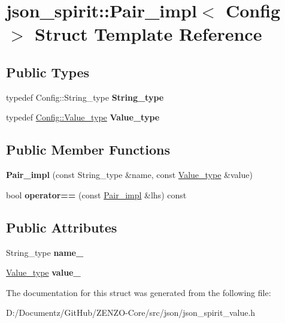 \hypertarget{structjson__spirit_1_1_pair__impl}{}\section{json\+\_\+spirit\+::Pair\+\_\+impl$<$ Config $>$ Struct Template Reference}
\label{structjson__spirit_1_1_pair__impl}
\subsection*{Public Types}
\begin{DoxyCompactItemize}
\item 
\mbox{\label{structjson__spirit_1_1_pair__impl_a76ee499775d02d1038a2b8c71621f2c8}} 
typedef Config\+::\+String\+\_\+type {\bfseries String\+\_\+type}
\item 
\mbox{\label{structjson__spirit_1_1_pair__impl_aa679fec3c6ec4c76f94460d3815cf1fb}} 
typedef \mbox{\hyperlink{classjson__spirit_1_1_value__impl}{Config\+::\+Value\+\_\+type}} {\bfseries Value\+\_\+type}
\end{DoxyCompactItemize}
\subsection*{Public Member Functions}
\begin{DoxyCompactItemize}
\item 
\mbox{\label{structjson__spirit_1_1_pair__impl_a17be0aede10233fadd376a3fb77fd962}} 
{\bfseries Pair\+\_\+impl} (const String\+\_\+type \&name, const \mbox{\hyperlink{classjson__spirit_1_1_value__impl}{Value\+\_\+type}} \&value)
\item 
\mbox{\label{structjson__spirit_1_1_pair__impl_a65173d62ed8baebe54f1e0ced1052398}} 
bool {\bfseries operator==} (const \mbox{\hyperlink{structjson__spirit_1_1_pair__impl}{Pair\+\_\+impl}} \&lhs) const
\end{DoxyCompactItemize}
\subsection*{Public Attributes}
\begin{DoxyCompactItemize}
\item 
\mbox{\label{structjson__spirit_1_1_pair__impl_ac39e926ac119e19889bdc44958a707da}} 
String\+\_\+type {\bfseries name\+\_\+}
\item 
\mbox{\label{structjson__spirit_1_1_pair__impl_aa669eda030541a05d8736db0839925e1}} 
\mbox{\hyperlink{classjson__spirit_1_1_value__impl}{Value\+\_\+type}} {\bfseries value\+\_\+}
\end{DoxyCompactItemize}


The documentation for this struct was generated from the following file\+:\begin{DoxyCompactItemize}
\item 
D\+:/\+Documentz/\+Git\+Hub/\+Z\+E\+N\+Z\+O-\/\+Core/src/json/json\+\_\+spirit\+\_\+value.\+h\end{DoxyCompactItemize}
